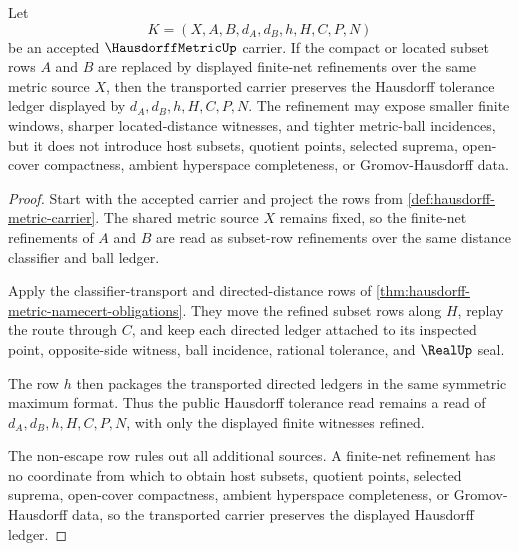 \begin{theorem}
\label{thm:hausdorff-metric-finite-net-stability}
Let
$$
K=(X,A,B,d_A,d_B,h,H,C,P,N)
$$
be an accepted $\HausdorffMetricUp$ carrier. If the compact or located subset rows $A$ and $B$ are replaced by displayed finite-net refinements over the same metric source $X$, then the transported carrier preserves the Hausdorff tolerance ledger displayed by $d_A,d_B,h,H,C,P,N$. The refinement may expose smaller finite windows, sharper located-distance witnesses, and tighter metric-ball incidences, but it does not introduce host subsets, quotient points, selected suprema, open-cover compactness, ambient hyperspace completeness, or Gromov-Hausdorff data.
\end{theorem}
\begin{proof}
Start with the accepted carrier and project the rows from \autoref{def:hausdorff-metric-carrier}. The shared metric source $X$ remains fixed, so the finite-net refinements of $A$ and $B$ are read as subset-row refinements over the same distance classifier and ball ledger.

Apply the classifier-transport and directed-distance rows of \autoref{thm:hausdorff-metric-namecert-obligations}. They move the refined subset rows along $H$, replay the route through $C$, and keep each directed ledger attached to its inspected point, opposite-side witness, ball incidence, rational tolerance, and $\RealUp$ seal.

The row $h$ then packages the transported directed ledgers in the same symmetric maximum format. Thus the public Hausdorff tolerance read remains a read of $d_A,d_B,h,H,C,P,N$, with only the displayed finite witnesses refined.

The non-escape row rules out all additional sources. A finite-net refinement has no coordinate from which to obtain host subsets, quotient points, selected suprema, open-cover compactness, ambient hyperspace completeness, or Gromov-Hausdorff data, so the transported carrier preserves the displayed Hausdorff ledger.
\end{proof}

